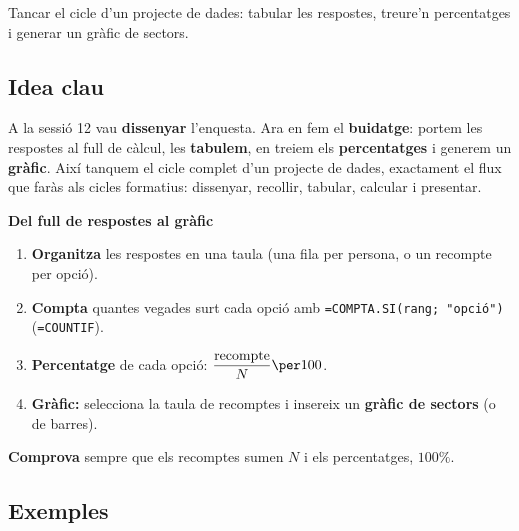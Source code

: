 %
{Tancar el cicle d'un projecte de dades: tabular les respostes, treure'n percentatges i generar un gràfic de sectors.}

\subsection{Idea clau}

A la sessió 12 vau \textbf{dissenyar} l'enquesta. Ara en fem el \textbf{buidatge}:
portem les respostes al full de càlcul, les \textbf{tabulem}, en treiem els
\textbf{percentatges} i generem un \textbf{gràfic}. Així tanquem el cicle complet d'un
projecte de dades, exactament el flux que faràs als cicles formatius: dissenyar,
recollir, tabular, calcular i presentar.

\begin{idea}
\textbf{Del full de respostes al gràfic}
\begin{enumerate}[leftmargin=1.6em, itemsep=2pt]
  \item \textbf{Organitza} les respostes en una taula (una fila per persona, o un
        recompte per opció).
  \item \textbf{Compta} quantes vegades surt cada opció amb \texttt{=COMPTA.SI(rang;\,"opció")}
        (\texttt{=COUNTIF}).
  \item \textbf{Percentatge} de cada opció: $\dfrac{\text{recompte}}{N}\per 100$.
  \item \textbf{Gràfic:} selecciona la taula de recomptes i insereix un \textbf{gràfic
        de sectors} (o de barres).
\end{enumerate}
\textbf{Comprova} sempre que els recomptes sumen $N$ i els percentatges, $100\%$.
\end{idea}

\subsection{Exemples}

